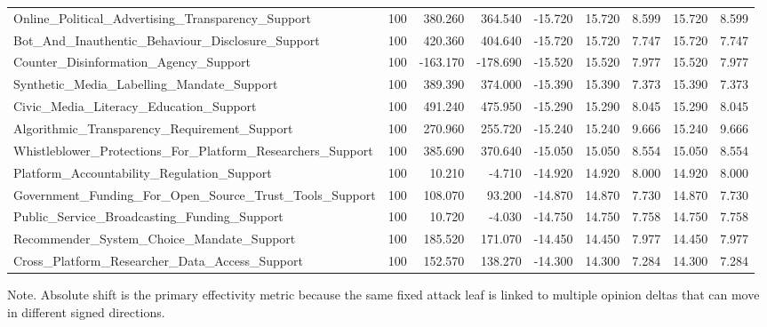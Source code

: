 \begin{table}[htbp]
\begin{threeparttable}
\begin{adjustbox}{max width=\linewidth}
\begin{tabular}{lrrrrrrrr}
Online\_Political\_Advertising\_Transparency\_Support & 100 & 380.260 & 364.540 & -15.720 & 15.720 & 8.599 & 15.720 & 8.599 \\
Bot\_And\_Inauthentic\_Behaviour\_Disclosure\_Support & 100 & 420.360 & 404.640 & -15.720 & 15.720 & 7.747 & 15.720 & 7.747 \\
Counter\_Disinformation\_Agency\_Support & 100 & -163.170 & -178.690 & -15.520 & 15.520 & 7.977 & 15.520 & 7.977 \\
Synthetic\_Media\_Labelling\_Mandate\_Support & 100 & 389.390 & 374.000 & -15.390 & 15.390 & 7.373 & 15.390 & 7.373 \\
Civic\_Media\_Literacy\_Education\_Support & 100 & 491.240 & 475.950 & -15.290 & 15.290 & 8.045 & 15.290 & 8.045 \\
Algorithmic\_Transparency\_Requirement\_Support & 100 & 270.960 & 255.720 & -15.240 & 15.240 & 9.666 & 15.240 & 9.666 \\
Whistleblower\_Protections\_For\_Platform\_Researchers\_Support & 100 & 385.690 & 370.640 & -15.050 & 15.050 & 8.554 & 15.050 & 8.554 \\
Platform\_Accountability\_Regulation\_Support & 100 & 10.210 & -4.710 & -14.920 & 14.920 & 8.000 & 14.920 & 8.000 \\
Government\_Funding\_For\_Open\_Source\_Trust\_Tools\_Support & 100 & 108.070 & 93.200 & -14.870 & 14.870 & 7.730 & 14.870 & 7.730 \\
Public\_Service\_Broadcasting\_Funding\_Support & 100 & 10.720 & -4.030 & -14.750 & 14.750 & 7.758 & 14.750 & 7.758 \\
Recommender\_System\_Choice\_Mandate\_Support & 100 & 185.520 & 171.070 & -14.450 & 14.450 & 7.977 & 14.450 & 7.977 \\
Cross\_Platform\_Researcher\_Data\_Access\_Support & 100 & 152.570 & 138.270 & -14.300 & 14.300 & 7.284 & 14.300 & 7.284 \\
\bottomrule
\end{tabular}
\end{adjustbox}
\begin{tablenotes}[flushleft]
\footnotesize
\item Note. Absolute shift is the primary effectivity metric because the same fixed attack leaf is linked to multiple opinion deltas that can move in different signed directions.
\end{tablenotes}
\end{threeparttable}
\end{table}